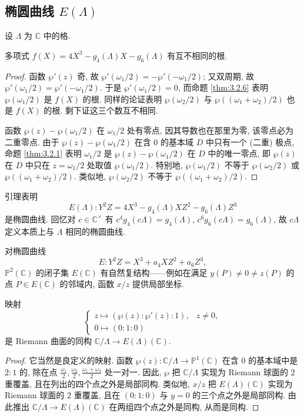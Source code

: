 \subsection*{椭圆曲线 $E(\Lambda)$}

设 $\Lambda$ 为 $\mathbb{C}$ 中的格.

\begin{lemma} \label{thm:3.3.6} 
多项式 $f(X) = 4X^3 - g_4(\Lambda)X - g_6(\Lambda)$ 有互不相同的根.
\end{lemma}

\begin{proof}
函数 $\wp'(z)$ 奇, 故 $\wp'(\omega_1/2) = -\wp'(-\omega_1/2)$; 又双周期, 故 $\wp'(\omega_1/2) = \wp'(-\omega_1/2)$. 于是 $\wp'(\omega_1/2) = 0$, 而命题 \ref{thm:3.2.6} 表明 $\wp(\omega_1/2)$ 是 $f(X)$ 的根. 同样的论证表明 $\wp(\omega_2/2)$ 与 $\wp((\omega_1+\omega_2)/2)$ 也是 $f(X)$ 的根. 剩下证这三个数互不相同.

函数 $\wp(z) - \wp(\omega_1/2)$ 在 $\omega_1/2$ 处有零点, 因其导数也在那里为零, 该零点必为二重零点. 由于 $\wp(z) - \wp(\omega_1/2)$ 在含 $0$ 的基本域 $D$ 中只有一个 (二重) 极点, 命题 \ref{thm:3.2.1} 表明 $\omega_1/2$ 是 $\wp(z) - \wp(\omega_1/2)$ 在 $D$ 中的唯一零点, 即 $\wp(z)$ 在 $D$ 中只在 $z = \omega_1/2$ 处取值 $\wp(\omega_1/2)$. 特别地, $\wp(\omega_1/2)$ 不等于 $\wp(\omega_2/2)$ 或 $\wp((\omega_1+\omega_2)/2)$. 类似地, $\wp(\omega_2/2)$ 不等于 $\wp((\omega_1+\omega_2)/2)$.
\end{proof}

引理表明
\[
E(\Lambda)\colon Y^2Z = 4X^3 - g_4(\Lambda)XZ^2 - g_6(\Lambda)Z^3
\]
是椭圆曲线. 回忆对 $c\in\mathbb{C}^{\times}$ 有 $c^4g_4(c\Lambda) = g_4(\Lambda)$, $c^6g_6(c\Lambda) = g_6(\Lambda)$, 故 $c\Lambda$ 定义本质上与 $\Lambda$ 相同的椭圆曲线.

对椭圆曲线
\[
E\colon Y^2Z = X^3 + a_4XZ^2 + a_6Z^3,
\]
$\mathbb{P}^2(\mathbb{C})$ 的闭子集 $E(\mathbb{C})$ 有自然复结构——例如在满足 $y(P)\neq 0\neq z(P)$ 的点 $P\in E(\mathbb{C})$ 的邻域内, 函数 $x/z$ 提供局部坐标.

\begin{proposition} \label{thm:3.3.7} 
映射
\[
\begin{cases}
z\mapsto(\wp(z):\wp'(z):1), & z\neq 0,\\
0\mapsto(0:1:0)
\end{cases}
\]
是 Riemann 曲面的同构 $\mathbb{C}/\Lambda\to E(\Lambda)(\mathbb{C})$.
\end{proposition}

\begin{proof}
它当然是良定义的映射. 函数 $\wp(z)\colon\mathbb{C}/\Lambda\to\mathbb{P}^1(\mathbb{C})$ 在含 $0$ 的基本域中是 $2:1$ 的, 除在点 $\frac{\omega_1}{2}, \frac{\omega_2}{2}, \frac{\omega_1+\omega_2}{2}$ 处一对一. 因此, $\wp$ 把 $\mathbb{C}/\Lambda$ 实现为 Riemann 球面的 $2$ 重覆盖, 且在列出的四个点之外是局部同构. 类似地, $x/z$ 把 $E(\Lambda)(\mathbb{C})$ 实现为 Riemann 球面的 $2$ 重覆盖, 且在 $(0:1:0)$ 与 $y = 0$ 的三个点之外是局部同构. 由此推出 $\mathbb{C}/\Lambda\to E(\Lambda)(\mathbb{C})$ 在两组四个点之外是同构, 从而是同构.
\end{proof}

